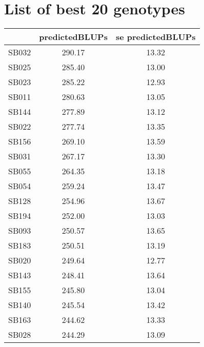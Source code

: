\documentclass[a4paper,11pt]{article}\usepackage[]{graphicx}\usepackage[]{color}
\begin{document}
\section{List of best 20 genotypes}
\begin{table}[ht]
\begin{flushleft}
\begin{tabular}{lcc}
  \hline
 & predictedBLUPs & se predictedBLUPs \\ 
  \hline
SB032 & 290.17 & 13.32 \\ 
  SB025 & 285.40 & 13.00 \\ 
  SB023 & 285.22 & 12.93 \\ 
  SB011 & 280.63 & 13.05 \\ 
  SB144 & 277.89 & 13.12 \\ 
  SB022 & 277.74 & 13.35 \\ 
  SB156 & 269.10 & 13.59 \\ 
  SB031 & 267.17 & 13.30 \\ 
  SB055 & 264.35 & 13.18 \\ 
  SB054 & 259.24 & 13.47 \\ 
  SB128 & 254.96 & 13.67 \\ 
  SB194 & 252.00 & 13.03 \\ 
  SB093 & 250.57 & 13.65 \\ 
  SB183 & 250.51 & 13.19 \\ 
  SB020 & 249.64 & 12.77 \\ 
  SB143 & 248.41 & 13.64 \\ 
  SB155 & 245.80 & 13.04 \\ 
  SB140 & 245.54 & 13.42 \\ 
  SB163 & 244.62 & 13.33 \\ 
  SB028 & 244.29 & 13.09 \\ 
   \hline
\end{tabular}
\label{bestTab}
\end{flushleft}
\end{table}


\end{document}
